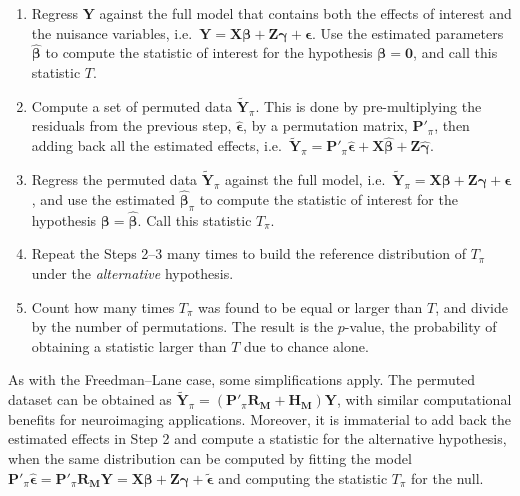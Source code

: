 \begin{enumerate}
\item Regress $\mathbf{Y}$ against the full model that contains both the effects of interest and the nuisance variables, i.e.\ $\mathbf{Y} = \mathbf{X}\boldsymbol{\beta} + \mathbf{Z}\boldsymbol{\gamma} + \boldsymbol{\epsilon}$. Use the estimated parameters $\boldsymbol{\hat{\beta}}$ to compute the statistic of interest for the hypothesis $\boldsymbol{\beta}=\boldsymbol{0}$, and call this statistic $T$.
\item Compute a set of permuted data $\mathbf{\tilde{Y}}_{\pi}$. This is done by pre-multiplying the residuals from the previous step, $\boldsymbol{\hat{\epsilon}}$, by a permutation matrix, $\mathbf{P}'_{\pi}$, then adding back all the estimated effects, i.e.\ $\mathbf{\tilde{Y}}_{\pi} = \mathbf{P}'_{\pi}\boldsymbol{\hat{\epsilon}} + \mathbf{X}\boldsymbol{\hat{\beta}} + \mathbf{Z}\boldsymbol{\hat{\gamma}}$.
\item Regress the permuted data $\mathbf{\tilde{Y}}_{\pi}$ against the full model, i.e.\ $\mathbf{\tilde{Y}}_{\pi} = \mathbf{X}\boldsymbol{\beta} + \mathbf{Z}\boldsymbol{\gamma} + \boldsymbol{\epsilon}$, and use the estimated $\boldsymbol{\hat{\beta}}_{\pi}$ to compute the statistic of interest for the hypothesis $\boldsymbol{\beta}=\boldsymbol{\hat{\beta}}$. Call this statistic $T_{\pi}$.
\item Repeat the Steps 2--3 many times to build the reference distribution of $T_{\pi}$ under the \emph{alternative} hypothesis.
\item Count how many times $T_{\pi}$ was found to be equal or larger than $T$, and divide by the number of permutations. The result is the $p$-value, the probability of obtaining a statistic larger than $T$ due to chance alone.
\end{enumerate}

As with the Freedman--Lane case, some simplifications apply. The permuted dataset can be obtained as $\mathbf{\tilde{Y}}_{\pi} = \left(\mathbf{P}'_{\pi}\mathbf{R}_{\mathbf{M}} + \mathbf{H}_{\mathbf{M}}\right)\mathbf{Y}$, with similar computational benefits for neuroimaging applications. Moreover, it is immaterial to add back the estimated effects in Step 2 and  compute a statistic for the alternative hypothesis, when the same distribution can be computed by fitting the model $\mathbf{P}'_{\pi}\boldsymbol{\hat{\epsilon}} = \mathbf{P}'_{\pi}\mathbf{R}_{\mathbf{M}}\mathbf{Y} = \mathbf{X}\boldsymbol{\beta} + \mathbf{Z}\boldsymbol{\gamma} + \boldsymbol{\tilde{\epsilon}}$ and computing the statistic $T_{\pi}$ for the null.

